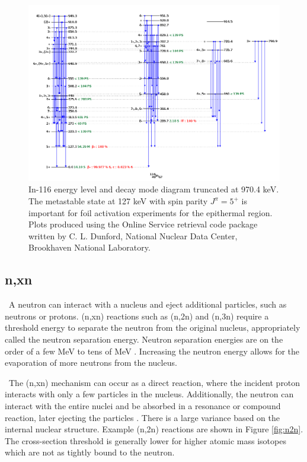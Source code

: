 \begin{figure}[ht]
	\includegraphics[width=\linewidth]{Figures/Chapter2/TruncatedIn116.png}
	\caption[In-116 energy level and decay mode diagram truncated at 970.4 keV]{In-116 energy level and decay mode diagram truncated at 970.4 keV. The metastable state at 127 keV with spin parity $J^{\pi} = 5^{+}$ is important for foil activation experiments for the epithermal region. Plots produced using the Online Service retrieval code package written by C. L. Dunford, National Nuclear Data Center, Brookhaven National Laboratory.}
	\label{fig:In116Rxn}
\end{figure}

\subsection{n,xn}

\ A neutron can interact with a nucleus and eject additional particles, such as neutrons or protons. 
(n,xn) reactions such as (n,2n) and (n,3n) require a threshold energy to separate the neutron from the original nucleus, appropriately called the neutron separation energy. 
Neutron separation energies are on the order of a few MeV to tens of MeV \cite{Krane,n2ns}. 
Increasing the neutron energy allows for the evaporation of more neutrons from the nucleus. 

\ The (n,xn) mechanism can occur as a direct reaction, where the incident proton interacts with only a few particles in the nucleus. 
Additionally, the neutron can interact with the entire nuclei and be absorbed in a resonance or compound reaction, later ejecting the particles \cite{Turner}. 
There is a large variance based on the internal nuclear structure. %
Example (n,2n) reactions are shown in Figure \ref{fig:n2n}. 
The cross-section threshold is generally lower for higher atomic mass isotopes which are not as tightly bound to the neutron. 

